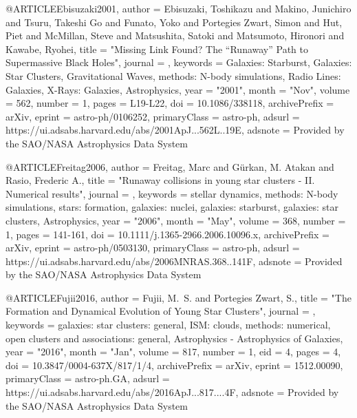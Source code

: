 \documentclass[twocolumn,tighten]{aastex63}
\begin{document}
{@ARTICLE{Ebisuzaki2001,
       author = {{Ebisuzaki}, Toshikazu and {Makino}, Junichiro and {Tsuru}, Takeshi Go and
         {Funato}, Yoko and {Portegies Zwart}, Simon and {Hut}, Piet and
         {McMillan}, Steve and {Matsushita}, Satoki and {Matsumoto}, Hironori and
         {Kawabe}, Ryohei},
        title = "{Missing Link Found? The ``Runaway'' Path to Supermassive Black Holes}",
      journal = {\apjl},
     keywords = {Galaxies: Starburst, Galaxies: Star Clusters, Gravitational Waves, methods: N-body simulations, Radio Lines: Galaxies, X-Rays: Galaxies, Astrophysics},
         year = "2001",
        month = "Nov",
       volume = {562},
       number = {1},
        pages = {L19-L22},
          doi = {10.1086/338118},
archivePrefix = {arXiv},
       eprint = {astro-ph/0106252},
 primaryClass = {astro-ph},
       adsurl = {https://ui.adsabs.harvard.edu/abs/2001ApJ...562L..19E},
      adsnote = {Provided by the SAO/NASA Astrophysics Data System}
}

@ARTICLE{Freitag2006,
       author = {{Freitag}, Marc and {G{\"u}rkan}, M. Atakan and {Rasio}, Frederic A.},
        title = "{Runaway collisions in young star clusters - II. Numerical results}",
      journal = {\mnras},
     keywords = {stellar dynamics, methods: N-body simulations, stars: formation, galaxies: nuclei, galaxies: starburst, galaxies: star clusters, Astrophysics},
         year = "2006",
        month = "May",
       volume = {368},
       number = {1},
        pages = {141-161},
          doi = {10.1111/j.1365-2966.2006.10096.x},
archivePrefix = {arXiv},
       eprint = {astro-ph/0503130},
 primaryClass = {astro-ph},
       adsurl = {https://ui.adsabs.harvard.edu/abs/2006MNRAS.368..141F},
      adsnote = {Provided by the SAO/NASA Astrophysics Data System}
}

@ARTICLE{Fujii2016,
       author = {{Fujii}, M.~S. and {Portegies Zwart}, S.},
        title = "{The Formation and Dynamical Evolution of Young Star Clusters}",
      journal = {\apj},
     keywords = {galaxies: star clusters: general, ISM: clouds, methods: numerical, open clusters and associations: general, Astrophysics - Astrophysics of Galaxies},
         year = "2016",
        month = "Jan",
       volume = {817},
       number = {1},
          eid = {4},
        pages = {4},
          doi = {10.3847/0004-637X/817/1/4},
archivePrefix = {arXiv},
       eprint = {1512.00090},
 primaryClass = {astro-ph.GA},
       adsurl = {https://ui.adsabs.harvard.edu/abs/2016ApJ...817....4F},
      adsnote = {Provided by the SAO/NASA Astrophysics Data System}
}

}
\end{document}
